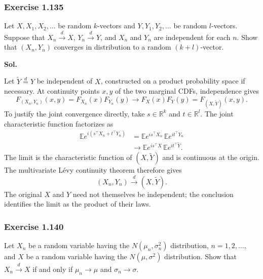 \documentclass[lang=en,11pt,a4paper,citestyle=authoryear]{elegantpaper}
\newcommand{\R}{\mathbb{R}}
\newcommand{\E}{\mathbb{E}}
\begin{document}
\subsubsection*{Exercise 1.135}
Let $X,X_1,X_2,\ldots$ be random $k$-vectors and
$Y,Y_1,Y_2,\ldots$ be random $l$-vectors. Suppose that
$X_n\xrightarrow{d}X$, $Y_n\xrightarrow{d}Y$, and $X_n$ and $Y_n$
are independent for each $n$. Show that $(X_n,Y_n)$ converges in
distribution to a random $(k+l)$-vector.
\par\vspace{0.5em}\noindent\textbf{Sol.}\par
Let $\widetilde Y\overset d=Y$ be independent of $X$, constructed
on a product probability space if necessary. At continuity points
$x,y$ of the two marginal CDFs, independence gives
\[
F_{(X_n,Y_n)}(x,y)=F_{X_n}(x)F_{Y_n}(y)
\longrightarrow F_X(x)F_Y(y)=F_{(X,\widetilde Y)}(x,y).
\]
To justify the joint convergence directly, take $s\in\R^k$ and
$t\in\R^l$. The joint characteristic function factorizes as
\[
\begin{aligned}
\E e^{i(s^\top X_n+t^\top Y_n)}
&=\E e^{is^\top X_n}\,\E e^{it^\top Y_n}\\
&\longrightarrow
\E e^{is^\top X}\,\E e^{it^\top\widetilde Y}.
\end{aligned}
\]
The limit is the characteristic function of $(X,\widetilde Y)$
and is continuous at the origin. The multivariate L\'evy continuity
theorem therefore gives
\[
\boxed{(X_n,Y_n)\xrightarrow d(X,\widetilde Y).}
\]
The original $X$ and $Y$ need not themselves be independent;
the conclusion identifies the limit as the product of their laws.

\subsubsection*{Exercise 1.140}
Let $X_n$ be a random variable having the $N(\mu_n,\sigma_n^2)$
distribution, $n=1,2,\ldots$, and $X$ be a random variable having
the $N(\mu,\sigma^2)$ distribution. Show that
$X_n\xrightarrow{d}X$ if and only if $\mu_n\to\mu$ and
$\sigma_n\to\sigma$.
\end{document}
